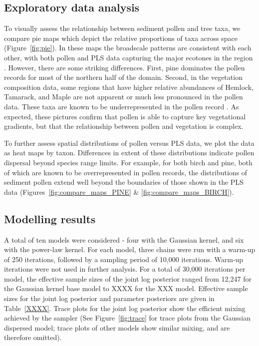 \documentclass[12pt]{article}
\begin{document}
\subsection{Exploratory data analysis}

To visually assess the relationship between sediment pollen and tree
taxa, we compare pie maps which depict the relative proportions of
taxa across space (Figure~\ref{fig:pie}). In these maps the broadscale
patterns are consistent with each other, with both pollen and PLS data
capturing the major ecotones in the region
\citep{solomon1985computer}.  However, there are some striking
differences. First, pine dominates the pollen records for most of the
northern half of the domain. Second, in the vegetation composition
data, some regions that have higher relative abundances of Hemlock,
Tamarack, and Maple are not apparent or much less pronounced in the
pollen data. These taxa are known to be underrepresented in the pollen
record \citep{XXX}. As expected, these pictures confirm that pollen is able
to capture key vegetational gradients, but that the relationship
between pollen and vegetation is complex.

To further assess spatial distributions of pollen versus PLS data, we
plot the data as heat maps by taxon. Differences in extent of these
distributions indicate pollen dispersal beyond species range
limits. For example, for both birch and pine, both of which are known
to be overrepresented in pollen records, the distributions of sediment
pollen extend well beyond the boundaries of those shown in the PLS
data (Figures~\ref{fig:compare_maps_PINE} \&
\ref{fig:compare_maps_BIRCH}).

\subsection{Modelling results}

A total of ten models were considered - four with the Gaussian kernel,
and six with the power-law kernel. For each model, three chains were
run with a warm-up of 250 iterations, followed by a sampling period of
10,000 iterations. Warm-up iterations were not used in further
analysis. For a total of 30,000 iterations per model, the effective
sample sizes of the joint log posterior ranged from 12,247 for the
Gaussian kernel base model to XXXX for the XXX model. Effective sample
sizes for the joint log posterior and parameter posteriors are given
in Table~\ref{XXXX}. Trace plots for the joint log posterior show the
efficient mixing achieved by the sampler (See Figure~\ref{fig:trace}
for trace plots from the Gaussian dispersed model; trace plots of
other models show similar mixing, and are therefore omitted).
\end{document}
